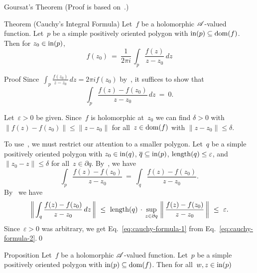 \documentclass[main]{subfiles}
\begin{document}
\begin{parsec}
\begin{point}[goursat]{Goursat's Theorem}
(Proof is based on~\cite{moore1900}.)
\end{point}%
\begin{point}{Theorem (Cauchy's Integral Formula)}%
Let~$f$ be a holomorphic $\mathscr{A}$-valued function.
Let~$p$ be a simple positively oriented 
polygon with $\operatorname{in}(p)\subseteq\operatorname{dom}(f)$.
Then for $z_0\in \operatorname{in}(p)$,
\begin{equation*}
f(z_0)\ = \ \frac{1}{2\pi i}\,\int_p \frac{f(z)}{z-z_0}\,dz
\end{equation*}
\begin{point}{Proof}%
Since~$\int_p \frac{f(z_0)}{z-z_0}\,dz
= 2\pi i f(z_0)$ by~,
it suffices to show that
\begin{equation}
\label{eq:cauchy-formula-1}
\int_p \frac{f(z)-f(z_0)}{z-z_0}\,dz \ = \ 0.
\end{equation}
\begin{point}%
Let~$\varepsilon>0$ be given.
Since~$f$ is holomorphic at~$z_0$
we can find $\delta>0$ with
$\|f(z)-f(z_0)\|\leq \|z-z_0\|$
for all~$z\in\operatorname{dom}(f)$ with $\|z-z_0\|\leq \delta$. 
\end{point}
\begin{point}%
To use~,
we must restrict our attention to a smaller polygon.
Let~$q$ be a simple positively oriented polygon 
with $z_0\in \operatorname{in}(q)$,  $\overline{q}\subseteq \operatorname{in}(p)$,
$\operatorname{length}(q)\leq \varepsilon$,
and $\|z_0-z\|\leq \delta$ for all~$z\in \partial q$.
By~, we have
\begin{equation}
\label{eq:cauchy-formula-2}
\int_p \frac{f(z)-f(z_0)}{z-z_0}
\ = \ 
\int_q \frac{f(z)-f(z_0)}{z-z_0}.
\end{equation}
By~
we have
\begin{equation*}
\left\|\,\int_q \frac{f(z)-f(z_0)}{z-z_0}\,dz\,\right\|
\ \leq \ \operatorname{length}(q)\,\cdot\,
\sup_{z\in\partial q} \,\left\|\,\frac{f(z)-f(z_0)}{z-z_0}\,\right\|
\ \leq \ \varepsilon.
\end{equation*}
Since~$\varepsilon>0$ was arbitrary,
we get Eq.~\eqref{eq:cauchy-formula-1}
from Eq.~\eqref{eq:cauchy-formula-2}.\qed
\end{point}
\end{point}
\end{point}
\begin{point}[taylor]{Proposition}%
Let~$f$ be a holomorphic $\mathscr{A}$-valued function.
Let~$p$ be a simple positively oriented polygon 
with $\operatorname{in}(p) \subseteq \operatorname{dom}(f)$.
Then for all~$w,z\in \operatorname{in}(p)$

\end{point}
\end{parsec}
\end{document}
